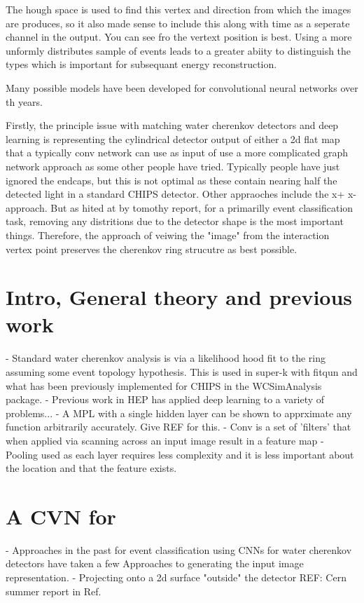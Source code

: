 The hough space is used to find this vertex and direction from which the images are produces, so it also made sense
to include this along with time as a seperate channel in the output. You can see fro the vertext position is best. Using
a more unformly distributes sample of events leads to a greater abiity to distinguish the types which is important
for subsequant energy reconstruction.

Many possible models have been developed for convolutional neural networks over th years.

Firstly, the principle issue with matching water cherenkov detectors and deep learning is representing the cylindrical
detector output of either a 2d flat map that a typically conv network can use as input of use a more complicated
graph network approach as some other people have tried. Typically people have just ignored the endcaps, but
this is not optimal as these contain nearing half the detected light in a standard CHIPS detector. Other appraoches
include the x+ x- approach. But as hited at by tomothy report, for a primarilly event classification task,
removing any distritions due to the detector shape is the most important things. Therefore, the approach of
veiwing the "image" from the interaction vertex point preserves the cherenkov ring strucutre as best possible.

\section{Intro, General theory and previous work}
- Standard water cherenkov analysis is via a likelihood hood fit to the ring assuming some event topology hypothesis.
This is used in super-k with fitqun and what has been previously implemented for CHIPS in the WCSimAnalysis package.
- Previous work in HEP has applied deep learning to a variety of problems...
- A MPL with a single hidden layer can be shown to apprximate any function arbitrarily accurately. Give REF for this.
- Conv is a set of 'filters' that when applied via scanning across an input image result in a feature map
- Pooling used as each layer requires less complexity and it is less important about the location and that the feature exists.

\section{A CVN for \chips}

- Approaches in the past for event classification using CNNs for water cherenkov detectors have taken a few Approaches
to generating the input image representation.
- Projecting onto a 2d surface "outside" the detector
REF: Cern summer report in Ref.~\cite{theodore2016}

